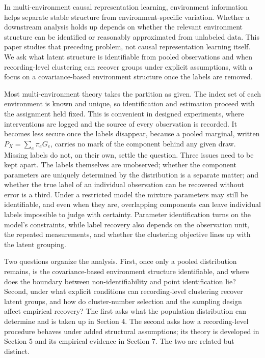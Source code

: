 In multi-environment causal representation learning, environment
information helps separate stable structure from environment-specific
variation. Whether a downstream analysis holds up depends on whether the
relevant environment structure can be identified or reasonably
approximated from unlabeled data. This paper studies that preceding
problem, not causal representation learning itself. We ask what latent
structure is identifiable from pooled observations and when
recording-level clustering can recover groups under explicit
assumptions, with a focus on a covariance-based environment structure
once the labels are removed.

Most multi-environment theory takes the partition as given. The index
set of each environment is known and unique, so identification and
estimation proceed with the assignment held fixed. This is convenient in
designed experiments, where interventions are logged and the source of
every observation is recorded. It becomes less secure once the labels
disappear, because a pooled marginal, written \(P_X=\sum_e\pi_e G_e\),
carries no mark of the component behind any given draw. Missing labels
do not, on their own, settle the question. Three issues need to be kept
apart. The labels themselves are unobserved; whether the component
parameters are uniquely determined by the distribution is a separate
matter; and whether the true label of an individual observation can be
recovered without error is a third. Under a restricted model the mixture
parameters may still be identifiable, and even when they are,
overlapping components can leave individual labels impossible to judge
with certainty. Parameter identification turns on the model's
constraints, while label recovery also depends on the observation unit,
the repeated measurements, and whether the clustering objective lines up
with the latent grouping.

Two questions organize the analysis. First, once only a pooled
distribution remains, is the covariance-based environment structure
identifiable, and where does the boundary between non-identifiability
and point identification lie? Second, under what explicit conditions can
recording-level clustering recover latent groups, and how do
cluster-number selection and the sampling design affect empirical
recovery? The first asks what the population distribution can determine
and is taken up in Section 4. The second asks how a recording-level
procedure behaves under added structural assumptions; its theory is
developed in Section 5 and its empirical evidence in Section 7. The two
are related but distinct.

